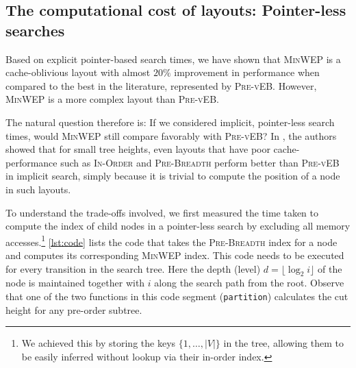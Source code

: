 \documentclass[10pt,conference,letterpaper]{IEEEtran}
\newcommand{\comment}[1]{}
\newcommand{\node}{node\xspace}
\newcommand{\pvl}{\textsc{Pre-vEB}\xspace}
\newcommand{\inorder}{\textsc{In-Order}\xspace}
\newcommand{\prebreadth}{\textsc{Pre-Breadth}\xspace}
\newcommand{\FLOOR}[1]{\ensuremath{\lfloor #1 \rfloor}\xspace}
\newcommand{\minwep}{\textsc{MinWEP}\xspace}
\begin{document}
\subsection{The computational cost of layouts: Pointer-less searches}

Based on explicit pointer-based search times, we have shown that \minwep is a cache-oblivious layout with almost $20\%$ improvement in performance when compared to the best in the literature, represented by \pvl. However, \minwep is a more complex layout than \pvl.
\comment{
and to ensure that the performance numbers are not affected by the time taken to compute the position of a \node in the layout, we have presented explicit pointer-based times so far. 
}
The natural question therefore is: If we considered implicit, pointer-less search times, would \minwep still compare favorably with \pvl? In \cite{Brodal:COSearch-vEBLayout}, the authors showed that for small tree heights, even layouts that have poor cache-performance such as \inorder and \prebreadth perform better than \pvl in implicit search, simply because it is trivial to compute the position of a \node in such layouts.

To understand the trade-offs involved, we first measured the time taken to compute the index of child nodes in a pointer-less search by excluding all memory accesses.\footnote{We achieved this by storing the keys $\{1, \ldots, |V|\}$ in the tree, allowing them to be easily inferred without lookup via their in-order index.}
\autoref{lst:code} lists the code that takes the \prebreadth index for a \node and computes its corresponding \minwep index.  This code needs to be executed for every transition in the search tree.  Here the depth (level) $d = \FLOOR{\log_2 i}$ of the node is maintained together with $i$ along the search path from the root.
Observe that one of the two functions in this code segment (\texttt{partition}) calculates the cut height for any pre-order subtree. 
\end{document}
